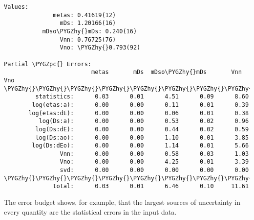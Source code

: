 \documentclass[letterpaper,10pt,english]{sphinxmanual}
\def\PYGZpc{\char`\%}
\def\PYGZhy{\char`\-}
\begin{document}
\begin{Verbatim}[commandchars=\\\{\}]
Values:
              metas: 0.41619(12)
                mDs: 1.20166(16)
           mDso\PYGZhy{}mDs: 0.240(16)
                Vnn: 0.76725(76)
                Vno: \PYGZhy{}0.793(92)

Partial \PYGZpc{} Errors:
                         metas       mDs  mDso\PYGZhy{}mDs       Vnn       Vno
\PYGZhy{}\PYGZhy{}\PYGZhy{}\PYGZhy{}\PYGZhy{}\PYGZhy{}\PYGZhy{}\PYGZhy{}\PYGZhy{}\PYGZhy{}\PYGZhy{}\PYGZhy{}\PYGZhy{}\PYGZhy{}\PYGZhy{}\PYGZhy{}\PYGZhy{}\PYGZhy{}\PYGZhy{}\PYGZhy{}\PYGZhy{}\PYGZhy{}\PYGZhy{}\PYGZhy{}\PYGZhy{}\PYGZhy{}\PYGZhy{}\PYGZhy{}\PYGZhy{}\PYGZhy{}\PYGZhy{}\PYGZhy{}\PYGZhy{}\PYGZhy{}\PYGZhy{}\PYGZhy{}\PYGZhy{}\PYGZhy{}\PYGZhy{}\PYGZhy{}\PYGZhy{}\PYGZhy{}\PYGZhy{}\PYGZhy{}\PYGZhy{}\PYGZhy{}\PYGZhy{}\PYGZhy{}\PYGZhy{}\PYGZhy{}\PYGZhy{}\PYGZhy{}\PYGZhy{}\PYGZhy{}\PYGZhy{}\PYGZhy{}\PYGZhy{}\PYGZhy{}\PYGZhy{}\PYGZhy{}\PYGZhy{}\PYGZhy{}\PYGZhy{}\PYGZhy{}\PYGZhy{}\PYGZhy{}\PYGZhy{}\PYGZhy{}\PYGZhy{}\PYGZhy{}
         statistics:      0.03      0.01      4.51      0.09      8.60
        log(etas:a):      0.00      0.00      0.11      0.01      0.39
       log(etas:dE):      0.00      0.00      0.06      0.01      0.38
          log(Ds:a):      0.00      0.00      0.53      0.02      0.96
         log(Ds:dE):      0.00      0.00      0.44      0.02      0.59
         log(Ds:ao):      0.00      0.00      1.10      0.01      3.85
        log(Ds:dEo):      0.00      0.00      1.14      0.01      5.66
                Vnn:      0.00      0.00      0.58      0.03      1.03
                Vno:      0.00      0.00      4.25      0.01      3.39
                svd:      0.00      0.00      0.00      0.00      0.00
\PYGZhy{}\PYGZhy{}\PYGZhy{}\PYGZhy{}\PYGZhy{}\PYGZhy{}\PYGZhy{}\PYGZhy{}\PYGZhy{}\PYGZhy{}\PYGZhy{}\PYGZhy{}\PYGZhy{}\PYGZhy{}\PYGZhy{}\PYGZhy{}\PYGZhy{}\PYGZhy{}\PYGZhy{}\PYGZhy{}\PYGZhy{}\PYGZhy{}\PYGZhy{}\PYGZhy{}\PYGZhy{}\PYGZhy{}\PYGZhy{}\PYGZhy{}\PYGZhy{}\PYGZhy{}\PYGZhy{}\PYGZhy{}\PYGZhy{}\PYGZhy{}\PYGZhy{}\PYGZhy{}\PYGZhy{}\PYGZhy{}\PYGZhy{}\PYGZhy{}\PYGZhy{}\PYGZhy{}\PYGZhy{}\PYGZhy{}\PYGZhy{}\PYGZhy{}\PYGZhy{}\PYGZhy{}\PYGZhy{}\PYGZhy{}\PYGZhy{}\PYGZhy{}\PYGZhy{}\PYGZhy{}\PYGZhy{}\PYGZhy{}\PYGZhy{}\PYGZhy{}\PYGZhy{}\PYGZhy{}\PYGZhy{}\PYGZhy{}\PYGZhy{}\PYGZhy{}\PYGZhy{}\PYGZhy{}\PYGZhy{}\PYGZhy{}\PYGZhy{}\PYGZhy{}
              total:      0.03      0.01      6.46      0.10     11.61
\end{Verbatim}

The error budget shows, for example, that the largest sources of uncertainty
in every quantity are the statistical errors in the input data.
\end{document}
